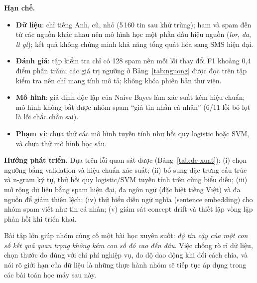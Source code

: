 \textbf{Hạn chế.}
\begin{itemize}
    \item \textbf{Dữ liệu}: chỉ tiếng Anh, cũ, nhỏ (5\,160 tin sau khử trùng); ham và spam đến từ các nguồn khác nhau nên mô hình học một phần dấu hiệu nguồn (\textit{lor}, \textit{da}, \textit{lt gt}); kết quả không chứng minh khả năng tổng quát hóa sang SMS hiện đại.
    \item \textbf{Đánh giá}: tập kiểm tra chỉ có 128 spam nên mỗi lỗi thay đổi F1 khoảng 0,4 điểm phần trăm; các giá trị ngưỡng ở Bảng~\ref{tab:nguong} được đọc trên tập kiểm tra nên chỉ mang tính mô tả; không khóa phiên bản thư viện.
    \item \textbf{Mô hình}: giả định độc lập của Naive Bayes làm xác suất kém hiệu chuẩn; mô hình không bắt được nhóm spam ``giả tin nhắn cá nhân'' (6/11 lỗi bỏ lọt là lỗi chắc chắn sai).
    \item \textbf{Phạm vi}: chưa thử các mô hình tuyến tính như hồi quy logistic hoặc SVM, và chưa thử mô hình học sâu.
\end{itemize}

\textbf{Hướng phát triển.} Dựa trên lỗi quan sát được (Bảng~\ref{tab:de-xuat}): (i) chọn ngưỡng bằng validation và hiệu chuẩn xác suất; (ii) bổ sung đặc trưng cấu trúc và n-gram ký tự, thử hồi quy logistic/SVM tuyến tính trên cùng biểu diễn; (iii) mở rộng dữ liệu bằng spam hiện đại, đa ngôn ngữ (đặc biệt tiếng Việt) và đa nguồn để giảm thiên lệch; (iv) thử biểu diễn ngữ nghĩa (sentence embedding) cho nhóm spam viết như tin cá nhân; (v) giám sát concept drift và thiết lập vòng lặp phản hồi khi triển khai.

Bài tập lớn giúp nhóm củng cố một bài học xuyên suốt: \textit{độ tin cậy của một con số kết quả quan trọng không kém con số đó cao đến đâu}. Việc chống rò rỉ dữ liệu, chọn thước đo đúng với chi phí nghiệp vụ, đo độ dao động khi đổi cách chia, và nói rõ giới hạn của dữ liệu là những thực hành nhóm sẽ tiếp tục áp dụng trong các bài toán học máy sau này.
